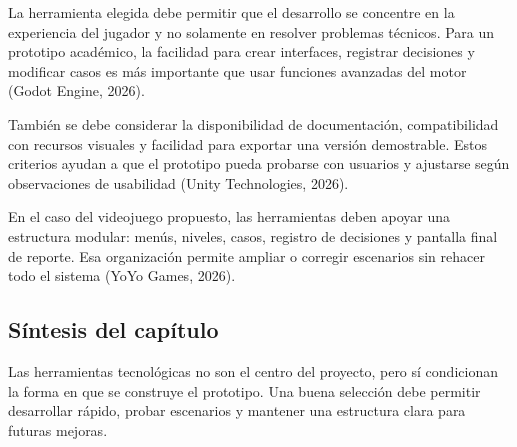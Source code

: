 La herramienta elegida debe permitir que el desarrollo se concentre en la experiencia del jugador y no solamente en resolver problemas t\'{e}cnicos. Para un prototipo acad\'{e}mico, la facilidad para crear interfaces, registrar decisiones y modificar casos es m\'{a}s importante que usar funciones avanzadas del motor (Godot Engine, 2026).

Tambi\'{e}n se debe considerar la disponibilidad de documentaci\'{o}n, compatibilidad con recursos visuales y facilidad para exportar una versi\'{o}n demostrable. Estos criterios ayudan a que el prototipo pueda probarse con usuarios y ajustarse seg\'{u}n observaciones de usabilidad (Unity Technologies, 2026).

En el caso del videojuego propuesto, las herramientas deben apoyar una estructura modular: men\'{u}s, niveles, casos, registro de decisiones y pantalla final de reporte. Esa organizaci\'{o}n permite ampliar o corregir escenarios sin rehacer todo el sistema (YoYo Games, 2026).

\subsection{S\'{i}ntesis del cap\'{i}tulo}

Las herramientas tecnol\'{o}gicas no son el centro del proyecto, pero s\'{i} condicionan la forma en que se construye el prototipo. Una buena selecci\'{o}n debe permitir desarrollar r\'{a}pido, probar escenarios y mantener una estructura clara para futuras mejoras.
